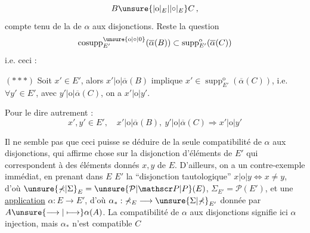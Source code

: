 
\[
B\unsure{|\mathrm{o}|_E|\lvert\circ\rvert_E}C\,,
\]
compte tenu de la  de $\alpha$ aux disjonctions.
Reste la question
\[
\operatorname{cosupp}^{\unsure{\mathrm{o}|\circ|0}}_{E'}(\overline\alpha(B))\subset\operatorname{supp}^{\mathrm{o}}_{E'}(\overline\alpha(C))
\]
i.e. ceci :

$(***)$ Soit $x'\in E'$, alors $x'|\mathrm{o}|\overline\alpha(B)$ implique $x'\in\operatorname{supp}^{\mathrm{o}}_{E'}(\overline\alpha(C))$, i.e. $\forall y'\in E'$, avec $y'|\mathrm{o}|\overline\alpha(C)$, on a $x'|\mathrm{o}|y'$.

Pour le dire autrement :
\[
x',y'\in E',\quad x'|\mathrm{o}|\overline\alpha(B),\ y'|\mathrm{o}|\overline\alpha(C)\Longrightarrow x'|\mathrm{o}|y'
\]

Il ne semble pas que ceci puisse se déduire de la seule compatibilité de $\alpha$ aux disjonctions, qui affirme  chose sur la disjonction  d'éléments  de $E'$ qui  correspondent à des éléments donnés $x,y$ de $E$.
D'ailleurs, on a un contre-exemple immédiat, en prenant dans $E$  $E'$ la ``disjonction tautologique'' $x|\mathrm{o}|y\Longleftrightarrow x\ne y$, d'où
$\unsure{\mathbb\Sigma|\Sigma}_E=\unsure{\mathcal P|\mathscr P|P}(E)$, $\mathbb\Sigma_{E'}=\mathcal P(E')$, et une \uline{application} $\alpha:E\longrightarrow E'$, d'où $\alpha_*:\mathbb\Sigma_E\longrightarrow\unsure{\Sigma|\mathbb\Sigma}_{E'}$ donnée par \deleted{$\unsure{\alpha}$} $A\unsure{\longrightarrow|\longmapsto}\alpha(A)$.
La compatibilité de $\alpha$ aux disjonctions signifie ici $\alpha$ injection, mais $\alpha_*$ n'est compatible  $C$
